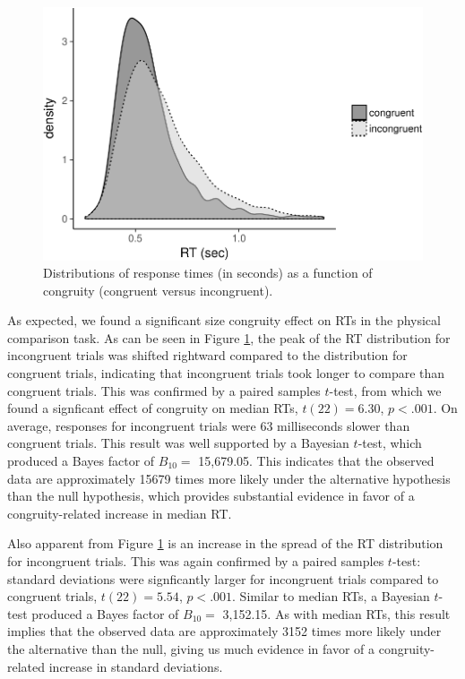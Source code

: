 \documentclass[english,,man]{apa6}
\theoremstyle{definition}
\theoremstyle{definition}
\theoremstyle{definition}
\theoremstyle{remark}
\begin{document}
\begin{figure}
\centering
\includegraphics{paper_files/figure-latex/densities-1.pdf}
\caption{\label{fig:densities}Distributions of response times (in seconds)
as a function of congruity (congruent versus incongruent).}
\end{figure}

As expected, we found a significant size congruity effect on RTs in the
physical comparison task. As can be seen in Figure \ref{fig:densities},
the peak of the RT distribution for incongruent trials was shifted
rightward compared to the distribution for congruent trials, indicating
that incongruent trials took longer to compare than congruent trials.
This was confirmed by a paired samples \(t\)-test, from which we found a
signficant effect of congruity on median RTs, \(t(22) = 6.30\),
\(p < .001\). On average, responses for incongruent trials were 63
milliseconds slower than congruent trials. This result was well
supported by a Bayesian \(t\)-test, which produced a Bayes factor of
\(B_{10}=\) 15,679.05. This indicates that the observed data are
approximately 15679 times more likely under the alternative hypothesis
than the null hypothesis, which provides substantial evidence in favor
of a congruity-related increase in median RT.

Also apparent from Figure \ref{fig:densities} is an increase in the
spread of the RT distribution for incongruent trials. This was again
confirmed by a paired samples \(t\)-test: standard deviations were
signficantly larger for incongruent trials compared to congruent trials,
\(t(22) = 5.54\), \(p < .001\). Similar to median RTs, a Bayesian
\(t\)-test produced a Bayes factor of \(B_{10}=\) 3,152.15. As with
median RTs, this result implies that the observed data are approximately
3152 times more likely under the alternative than the null, giving us
much evidence in favor of a congruity-related increase in standard
deviations.
\end{document}
